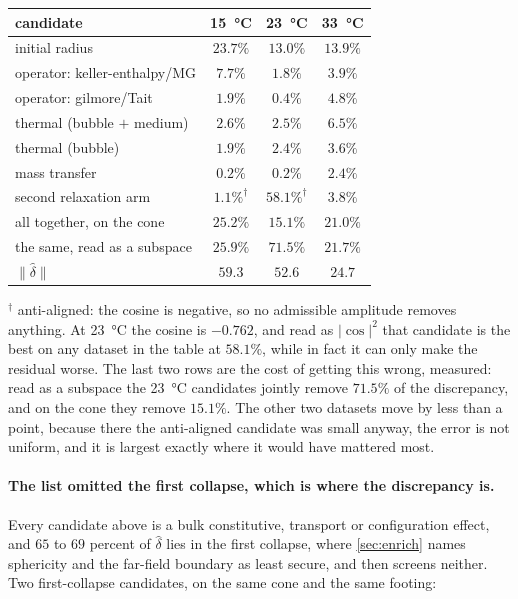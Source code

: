\documentclass[10pt]{article}
\begin{document}
\begin{center}
\begin{tabular}{lccc}
\toprule
candidate & \SI{15}{\celsius} & \SI{23}{\celsius} & \SI{33}{\celsius} \\
\midrule
initial radius                & $\mathbf{23.7\%}$ & $\mathbf{13.0\%}$ & $\mathbf{13.9\%}$ \\
operator: keller-enthalpy/MG  & $7.7\%$ & $1.8\%$ & $3.9\%$ \\
operator: gilmore/Tait        & $1.9\%$ & $0.4\%$ & $4.8\%$ \\
thermal (bubble $+$ medium)   & $2.6\%$ & $2.5\%$ & $6.5\%$ \\
thermal (bubble)              & $1.9\%$ & $2.4\%$ & $3.6\%$ \\
mass transfer                 & $0.2\%$ & $0.2\%$ & $2.4\%$ \\
second relaxation arm         & $1.1\%^\dagger$ & $58.1\%^\dagger$ & $3.8\%$ \\
\midrule
all together, on the cone     & $25.2\%$ & $\mathbf{15.1\%}$ & $21.0\%$ \\
the same, read as a subspace  & $25.9\%$ & $\mathbf{71.5\%}$ & $21.7\%$ \\
$\lVert\hat\delta\rVert$      & $59.3$ & $52.6$ & $24.7$ \\
\bottomrule
\end{tabular}
\end{center}

\noindent $^\dagger$ anti-aligned: the cosine is negative, so no admissible amplitude removes
anything. At \SI{23}{\celsius} the cosine is $-0.762$, and read as $\lvert\cos\rvert^2$ that
candidate is the best on any dataset in the table at $58.1\%$, while in fact it can only make
the residual worse. The last two rows are the cost of getting this wrong, measured: read as a
subspace the \SI{23}{\celsius} candidates jointly remove $71.5\%$ of the discrepancy, and on
the cone they remove $15.1\%$. The other two datasets move by less than a point, because there
the anti-aligned candidate was small anyway, the error is not uniform, and it is largest
exactly where it would have mattered most.

\paragraph{The list omitted the first collapse, which is where the discrepancy is.}
Every candidate above is a bulk constitutive, transport or configuration effect, and $65$ to
$69$ percent of $\hat\delta$ lies in the first collapse, where \cref{sec:enrich} names
sphericity and the far-field boundary as least secure, and then screens neither. Two
first-collapse candidates, on the same cone and the same footing:
\end{document}
